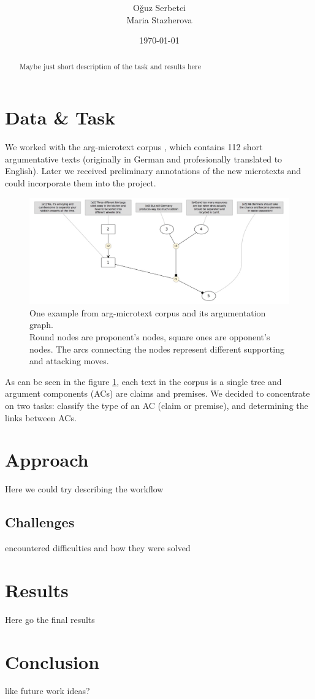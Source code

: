 \documentclass[onecolumn]{article}
\title{\spacecaps{Project module report: Argumentation Mining }\\ \normalsize \spacesc{University of Potsdam, Winter semester 2017/18} }
\author{Oğuz Serbetci\\Maria Stazherova}
\date{\today}
\begin{document}
\maketitle

\begin{abstract}

Maybe just short description of the task and results here

\end{abstract}


\section{Data \& Task}
We worked with the arg-microtext corpus \cite{peldszus2015annotated}, which contains 112 short argumentative texts 
(originally in German and profesionally translated to English). Later we received preliminary annotations of the new microtexts
and could incorporate them into the project.

\begin{figure}[h]
    \centering
    \includegraphics[width=\linewidth]{fig/microtext.jpg}
    \caption{One example from arg-microtext corpus and its argumentation graph.
            \\Round nodes are proponent's nodes, square ones are opponent's nodes. The arcs connecting the nodes represent different supporting and attacking moves.}
    \label{fig:microtext}
        \end{figure}

As can be seen in the figure \ref{fig:microtext}, each text in the corpus is a single tree and argument components (ACs) are claims and premises.  
We decided to concentrate on two tasks: classify the type of an AC (claim or premise), and determining the links between ACs.

\section{Approach}
Here we could try describing the workflow

\subsection{Challenges}
encountered difficulties and how they were solved 



\section{Results}

Here go the final results

\section{Conclusion}
like future work ideas?

\nocite{*}


\end{document}
